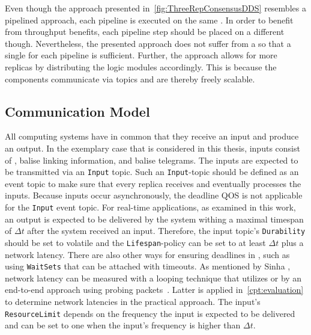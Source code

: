 Even though the approach presented in~\autoref{fig:ThreeRepConsensusDDS} resembles a pipelined approach, each pipeline is executed on the same .
In order to benefit from throughput benefits, each pipeline step should be placed on a different  though.
Nevertheless, the presented approach does not suffer from a \ChallengeThrough so that a single  for each pipeline is sufficient.
Further, the approach allows for more replicas by distributing the logic modules accordingly.
This is because the components communicate via  topics and are thereby freely scalable.

\subsection{Communication Model}
All computing systems have in common that they receive an input and produce an output.
In the exemplary case that is considered in this thesis, inputs consist of , balise linking information, and balise telegrams.
The inputs are expected to be transmitted via an \texttt{Input}  topic.
Such an \texttt{Input}-topic should be defined as an event topic to make sure that every replica receives and eventually processes the inputs.
Because inputs occur asynchronously, the deadline \gls*{QOS} is not applicable for the \texttt{Input} event topic.
For real-time applications, as examined in this work, an output is expected to be delivered by the system withing a maximal timespan of $\Delta t$ after the system received an input.
Therefore, the input topic's \texttt{Durability} should be set to volatile and the \texttt{Lifespan}-policy can be set to at least $\Delta t$ plus a network latency.
There are also other ways for ensuring deadlines in , such as using \texttt{WaitSets} that can be attached with timeouts.
As mentioned by Sinha \etal, network latency can be measured with a looping technique that utilizes   or by an end-to-end approach using probing packets~\cite{SinhaMeasureNetworkLatency}.
Latter is applied in~\autoref{cpt:evaluation} to determine network latencies in the practical approach.
The input's \texttt{ResourceLimit} depends on the frequency the input is expected to be delivered and can be set to one when the input's frequency is higher than $\Delta t$.
\\

